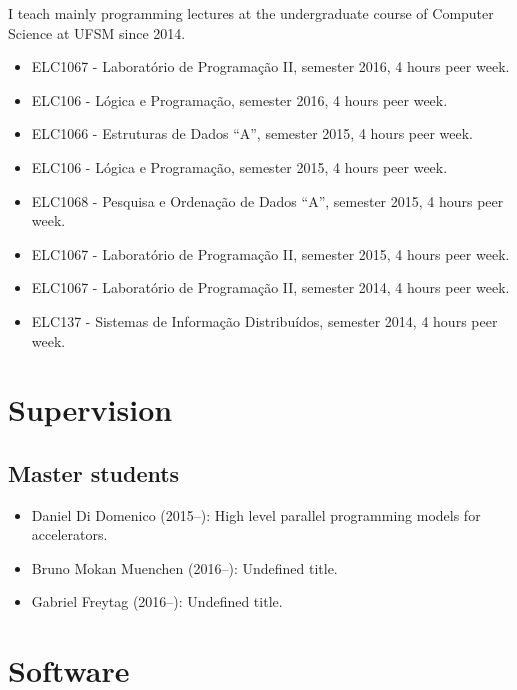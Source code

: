 \documentclass[11pt,a4paper]{article}
\begin{document}
I teach mainly programming lectures at the undergraduate course of Computer
Science at UFSM since 2014.
\begin{itemize}
\item ELC1067 - Laboratório de Programação II,  semester 2016, 4 hours peer week.
\item ELC106 - Lógica e Programação,  semester 2016, 4 hours peer week.
\item ELC1066 - Estruturas de Dados ``A'',  semester 2015, 4 hours peer week.
\item ELC106 - Lógica e Programação,  semester 2015, 4 hours peer week.
\item ELC1068 - Pesquisa e Ordenação de Dados ``A'',  semester 2015, 4 hours peer week. 
\item ELC1067 - Laboratório de Programação II,  semester 2015, 4 hours peer week.
\item ELC1067 - Laboratório de Programação II,  semester 2014, 4 hours peer week.
\item ELC137 - Sistemas de Informação Distribuídos,  semester 2014, 4 hours peer week.
\end{itemize}

\section{Supervision}

\subsection{Master students}

\begin{itemize} \itemsep -2pt
\item Daniel Di Domenico (2015--): High level parallel programming models for accelerators.
\item Bruno Mokan Muenchen (2016--): Undefined title.
\item Gabriel Freytag (2016--): Undefined title.
\end{itemize}

\section{Software}
\end{document}

